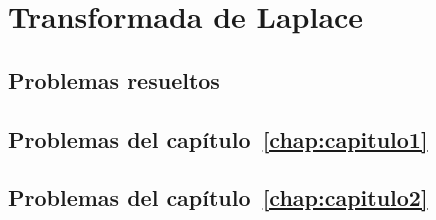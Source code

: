 \documentclass[draft, a4paper, 10pt]{book}
\begin{document}
\chapter{Transformada de Laplace}
\label{chap:capitulo6}


\begin{appendices}

\chapter{Problemas resueltos}

\section[Problemas del capítulo 1]{Problemas del capítulo~\ref{chap:capitulo1}}


\section[Problemas del capítulo 2]{Problemas del capítulo~\ref{chap:capitulo2}}


\end{appendices}
\end{document}
